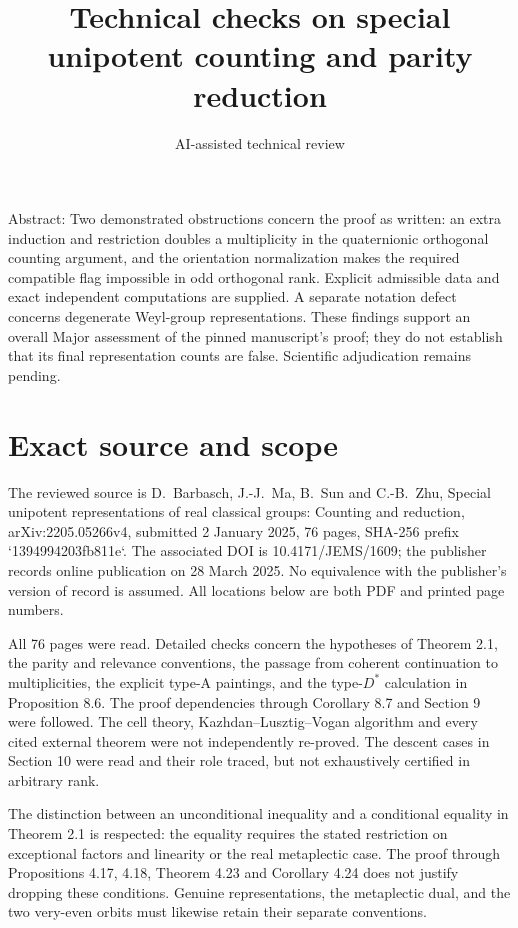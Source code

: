 \documentclass[10pt]{article}
\title{Technical checks on special unipotent counting and parity reduction}
\author{AI-assisted technical review}
\date{}
\begin{document}
\maketitle
Abstract: Two demonstrated obstructions concern the proof as written: an extra induction and restriction doubles a multiplicity in the quaternionic orthogonal counting argument, and the orientation normalization makes the required compatible flag impossible in odd orthogonal rank. Explicit admissible data and exact independent computations are supplied. A separate notation defect concerns degenerate Weyl-group representations. These findings support an overall Major assessment of the pinned manuscript’s proof; they do not establish that its final representation counts are false. Scientific adjudication remains pending.\par
\section*{Exact source and scope}
The reviewed source is D. Barbasch, J.-J. Ma, B. Sun and C.-B. Zhu, Special unipotent representations of real classical groups: Counting and reduction, arXiv:2205.05266v4, submitted 2 January 2025, 76 pages, SHA-256 prefix `1394994203fb811e`. The associated DOI is 10.4171/JEMS/1609; the publisher records online publication on 28 March 2025. No equivalence with the publisher’s version of record is assumed. All locations below are both PDF and printed page numbers.\par
All 76 pages were read. Detailed checks concern the hypotheses of Theorem 2.1, the parity and relevance conventions, the passage from coherent continuation to multiplicities, the explicit type-A paintings, and the type-\(D^*\) calculation in Proposition 8.6. The proof dependencies through Corollary 8.7 and Section 9 were followed. The cell theory, Kazhdan–Lusztig–Vogan algorithm and every cited external theorem were not independently re-proved. The descent cases in Section 10 were read and their role traced, but not exhaustively certified in arbitrary rank.\par
The distinction between an unconditional inequality and a conditional equality in Theorem 2.1 is respected: the equality requires the stated restriction on exceptional factors and linearity or the real metaplectic case. The proof through Propositions 4.17, 4.18, Theorem 4.23 and Corollary 4.24 does not justify dropping these conditions. Genuine representations, the metaplectic dual, and the two very-even orbits must likewise retain their separate conventions.\par
\end{document}
